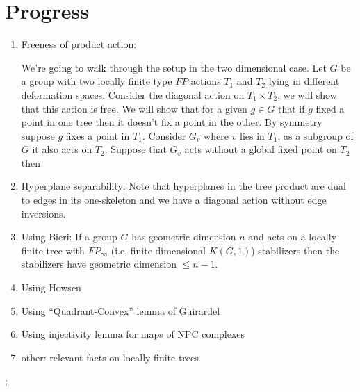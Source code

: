 \documentclass{article}
\theoremstyle{mystyle}
\theoremstyle{remark}
\begin{document}
\section{Progress}

\begin{enumerate}
    \item Freeness of product action:

	    We're going to walk through the setup in the two dimensional case. Let \(G\) be a group with two locally finite type \(FP\) actions \(T_{1}\) and \(T_{2}\) lying in different deformation spaces.  Consider the diagonal action on \(T_{1} \times T_{2}\), we will show that this action is free. {\color{mypink1}We will show that for a given \(g \in G\) that if \(g\) fixed a point in one tree then it doesn't fix a point in the other. By symmetry suppose \(g\) fixes a point in \(T_{1}\). Consider \(G_{v}\) where \(v\) lies in \(T_{1}\), as a subgroup of \(G\) it also acts on \(T_{2}\). Suppose that \(G_{v}\) acts without a global fixed point on \(T_{2}\) then }
    \item Hyperplane separability:
        Note that hyperplanes in the tree product are dual to edges in its one-skeleton and we have a diagonal action without edge inversions.
    \item Using Bieri: If a group \(G\) has geometric dimension \(n\) and acts on a locally finite tree with \(FP_\infty\) (i.e. finite dimensional \(K(G,1)\)) stabilizers then the stabilizers have geometric dimension \(\leq n-1\).
    \item Using Howsen
    \item Using ``Quadrant-Convex'' lemma of Guirardel 
    \item Using injectivity lemma for maps of NPC complexes
    \item other: relevant facts on locally finite trees
\end{enumerate};
\end{document}
